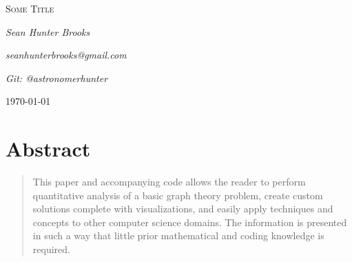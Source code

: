 \documentclass[12pt]{article}
\begin{document}





\begin{titlepage}
	\centering
	{\scshape\LARGE Some Title \par}
	\vspace{4cm}
	{\Large\itshape Sean Hunter Brooks\par}
	{\Large\itshape seanhunterbrooks@gmail.com\par}
	{\Large\itshape Git: @astronomerhunter\par}
	\vspace{9cm}
	\vfill
	{\large \today\par}
\end{titlepage}

\section*{Abstract}

\begin{quote}

This paper and accompanying code allows the reader to perform quantitative analysis of a basic graph theory problem, create custom solutions complete with visualizations, and easily apply techniques and concepts to other computer science domains.  The information is presented in such a way that little prior mathematical and coding knowledge is required.

\end{quote}
\end{document}
